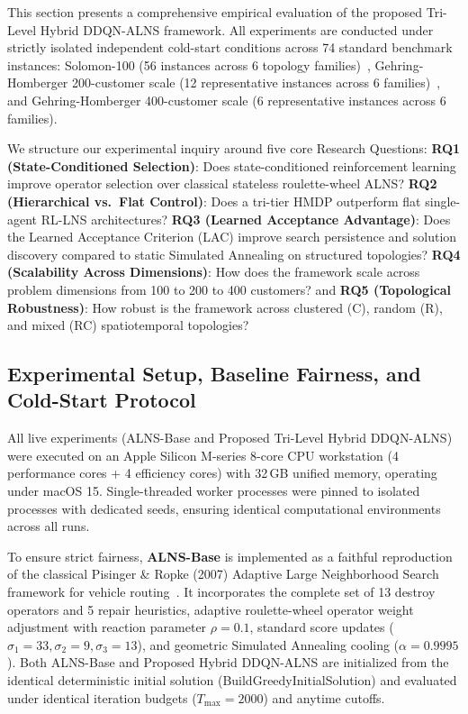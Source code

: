 \documentclass{ieeeaccess}
\begin{document}
This section presents a comprehensive empirical evaluation of the proposed Tri-Level Hybrid DDQN-ALNS framework. All experiments are conducted under strictly isolated independent cold-start conditions across 74 standard benchmark instances: Solomon-100 (56 instances across 6 topology families)~\cite{Solomon1987}, Gehring-Homberger 200-customer scale (12 representative instances across 6 families)~\cite{gehring1999parallel}, and Gehring-Homberger 400-customer scale (6 representative instances across 6 families).

We structure our experimental inquiry around five core Research Questions: \textbf{RQ1 (State-Conditioned Selection)}: Does state-conditioned reinforcement learning improve operator selection over classical stateless roulette-wheel ALNS? \textbf{RQ2 (Hierarchical vs.\ Flat Control)}: Does a tri-tier HMDP outperform flat single-agent RL-LNS architectures? \textbf{RQ3 (Learned Acceptance Advantage)}: Does the Learned Acceptance Criterion (LAC) improve search persistence and solution discovery compared to static Simulated Annealing on structured topologies? \textbf{RQ4 (Scalability Across Dimensions)}: How does the framework scale across problem dimensions from 100 to 200 to 400 customers? and \textbf{RQ5 (Topological Robustness)}: How robust is the framework across clustered (C), random (R), and mixed (RC) spatiotemporal topologies?

\subsection{Experimental Setup, Baseline Fairness, and Cold-Start Protocol}
\label{sec:exp_setup}

All live experiments (ALNS-Base and Proposed Tri-Level Hybrid DDQN-ALNS) were executed on an Apple Silicon M-series 8-core CPU workstation (4 performance cores + 4 efficiency cores) with 32\,GB unified memory, operating under macOS 15. Single-threaded worker processes were pinned to isolated processes with dedicated seeds, ensuring identical computational environments across all runs.

To ensure strict fairness, \textbf{ALNS-Base} is implemented as a faithful reproduction of the classical Pisinger \& Ropke (2007) Adaptive Large Neighborhood Search framework for vehicle routing~\cite{pisinger2007general}. It incorporates the complete set of 13 destroy operators and 5 repair heuristics, adaptive roulette-wheel operator weight adjustment with reaction parameter $\rho = 0.1$, standard score updates ($\sigma_1 = 33, \sigma_2 = 9, \sigma_3 = 13$), and geometric Simulated Annealing cooling ($\alpha = 0.9995$). Both ALNS-Base and Proposed Hybrid DDQN-ALNS are initialized from the identical deterministic initial solution (\textsf{\small BuildGreedyInitialSolution}) and evaluated under identical iteration budgets ($T_{\max} = 2000$) and anytime cutoffs.
\end{document}
